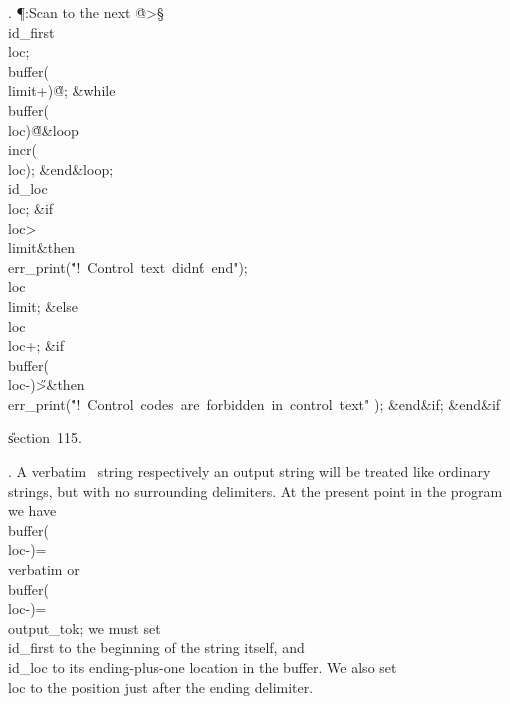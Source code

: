 . \P\?:Scan to the next \.{@>}\X\S\?\6
\\{id\_first}\?\K\?\\{loc};\5
\\{buffer}\?\1(\?\\{limit}\?+\?\2)\K\?\H{@};\6
\1\&{while}\8\\{buffer}\?\1(\?\\{loc}\?\2)\I\?\H{@}\8\&{loop}\6
\\{incr}\?\1(\?\\{loc}\?\2)\?;\2\6
\&{end}\8\&{loop};\6
\\{id\_loc}\?\K\?\\{loc};\6
\&{if}\1\1\8\\{loc}\?>\?\\{limit}\2\8\&{then}\6
\\{err\_print}\?\1(\?\.{"!\ Control\ text\ didn\'t\ end"}\?\2)\?;\6
\\{loc}\?\K\?\\{limit};\6
\4\&{else}\6
\\{loc}\?\K\?\\{loc}\?+;\6
\&{if}\1\1\8\\{buffer}\?\1(\?\\{loc}\?-\?\2)\I\?\H{>}\2\8\&{then}\6
\\{err\_print}\?\1(\?\.{"!\ Control\ codes\ are\ forbidden\ in\ control\ text"}%
\?\2)\?;\2\6
\&{end}\8\2\&{if}\1;\2\6
\&{end}\8\2\&{if}\1\par
\U section~115.\fi

. A verbatim \ADA\ string respectively an output string will be treated
like
ordinary strings, but with no surrounding delimiters.  At the present point
in the program we have \\{buffer}\?(\?\\{loc}\?-\?)=\?\\{verbatim} or
\\{buffer}\?(\?\\{loc}\?-\?)=\?\\{output\_tok}; we must set \\{id\_first} to
the beginning
of the string itself, and \\{id\_loc} to its ending-plus-one location in the
buffer.  We also set \\{loc} to the position just after the ending delimiter.

